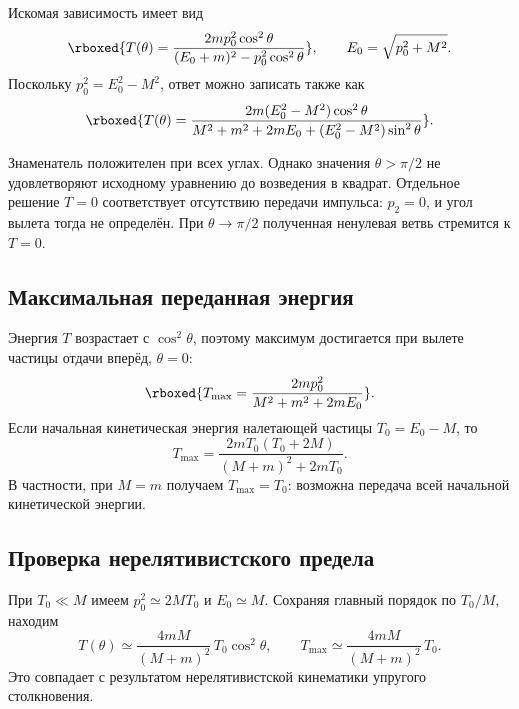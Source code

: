 \documentclass[../final.tex]{subfiles}
\begin{document}
Искомая зависимость имеет вид
%
\begin{equation*}
    \rboxed{
        T(\theta)=
        \frac{2mp_0^2\cos^2\theta}
        {(E_0+m)^2-p_0^2\cos^2\theta}
    },
    \qquad E_0=\sqrt{p_0^2+M^2}.
\end{equation*}
%
Поскольку $p_0^2=E_0^2-M^2$, ответ можно записать также как
%
\begin{equation*}
    \rboxed{
        T(\theta)=
        \frac{2m(E_0^2-M^2)\cos^2\theta}
        {M^2+m^2+2mE_0+(E_0^2-M^2)\sin^2\theta}
    }.
\end{equation*}

Знаменатель положителен при всех углах.
Однако значения $\theta>\pi/2$ не удовлетворяют исходному
уравнению до возведения в квадрат.
Отдельное решение $T=0$ соответствует отсутствию передачи импульса:
$p_2=0$, и угол вылета тогда не определён.
При $\theta\to\pi/2$ полученная ненулевая ветвь стремится к $T=0$.

\subsection*{Максимальная переданная энергия}

Энергия $T$ возрастает с $\cos^2\theta$, поэтому максимум
достигается при вылете частицы отдачи вперёд, $\theta=0$:
%
\begin{equation*}
    \rboxed{
        T_{\max}=
        \frac{2mp_0^2}{M^2+m^2+2mE_0}
    }.
\end{equation*}
%
Если начальная кинетическая энергия налетающей частицы
$T_0=E_0-M$, то
%
\begin{equation*}
    T_{\max}=
    \frac{2mT_0(T_0+2M)}{(M+m)^2+2mT_0}.
\end{equation*}
%
В частности, при $M=m$ получаем $T_{\max}=T_0$:
возможна передача всей начальной кинетической энергии.

\subsection*{Проверка нерелятивистского предела}

При $T_0\ll M$ имеем $p_0^2\simeq2MT_0$ и $E_0\simeq M$.
Сохраняя главный порядок по $T_0/M$, находим
%
\begin{equation*}
    T(\theta)\simeq
    \frac{4mM}{(M+m)^2}\,T_0\cos^2\theta,
    \qquad
    T_{\max}\simeq\frac{4mM}{(M+m)^2}\,T_0.
\end{equation*}
%
Это совпадает с результатом нерелятивистской кинематики
упругого столкновения.
\end{document}
